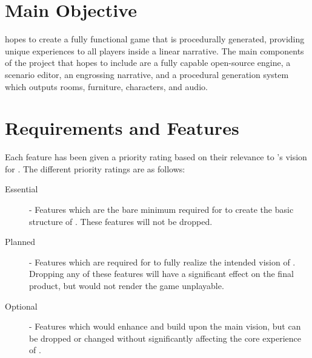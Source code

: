 \documentclass{GlobalDocument}
\begin{document}





\chapter{Main Objective}
\ourteam{} hopes to create a fully functional game that is procedurally generated, providing unique experiences to all players inside a linear narrative. The main components of the project that \ourteam{} hopes to include are a fully capable open-source engine, a scenario editor, an engrossing narrative, and a procedural generation system which outputs rooms, furniture, characters, and audio.



\chapter{Requirements and Features}
Each feature has been given a priority rating based on their relevance to \ourteam{}'s vision for \ourgame{}. The different priority ratings are as follows:
\begin{description}
\item[Essential]{- Features which are the bare minimum required for \ourteam{} to create the basic structure of \ourgame{}. These features will not be dropped.}
\item[Planned]{- Features which are required for \ourteam{} to fully realize the intended vision of \ourgame{}. Dropping any of these features will have a significant effect on the final product, but would not render the game unplayable.}
\item[Optional]{- Features which would enhance and build upon the main vision, but can be dropped or changed without significantly affecting the core experience of \ourgame{}.}
\end{description}
\end{document}
